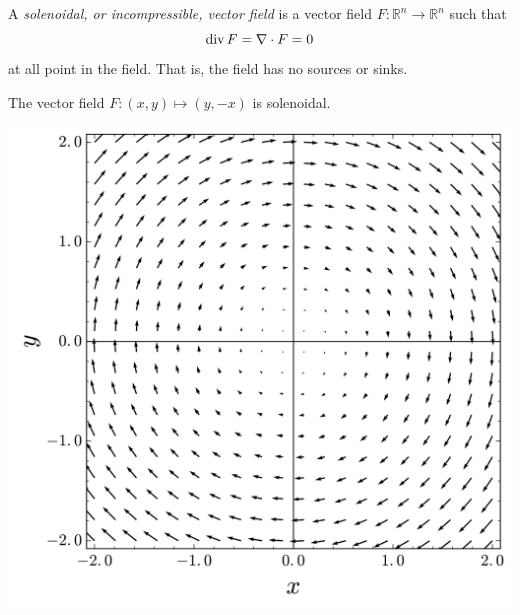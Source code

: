   \begin{definition}
  A \textit{solenoidal, or incompressible, vector field} is a vector field $F: \mathbb{R}^n \longrightarrow \mathbb{R}^n$ such that
  \[\operatorname{div} F = \nabla \cdot F = 0\]
  at all point in the field. That is, the field has no sources or sinks. 
  \end{definition}

  \begin{example}
  The vector field $F: (x, y) \mapsto (y, -x)$ is solenoidal. 
  \begin{center}
      \includegraphics[scale=0.17]{img/Solenoidal_vector_field.png}
  \end{center}
  \end{example}

